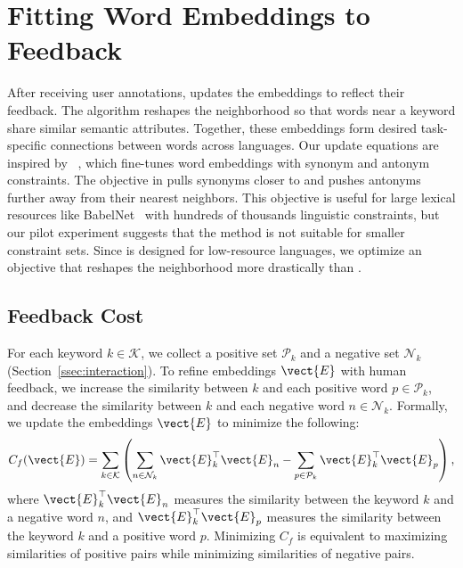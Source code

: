 \section{Fitting Word Embeddings to Feedback}
\label{sec:update}

After receiving user annotations, \name{} updates the
embeddings to reflect their feedback.
The algorithm reshapes the neighborhood so that words near a keyword share similar semantic attributes.
Together, these embeddings form desired task-specific
connections between words across languages.  Our update equations are inspired by ~\citep{mrksic-17}, which fine-tunes word embeddings with
synonym and antonym constraints.
The objective in  pulls synonyms
closer to and pushes antonyms further away from their nearest
neighbors.
This objective is useful for large lexical resources like
BabelNet~\citep{navigli-10} with hundreds of thousands linguistic constraints,
but our pilot experiment suggests that the method is not suitable for smaller
constraint sets.
Since \name{} is designed for low-resource languages, we optimize an
objective that reshapes the neighborhood more drastically than
.

\subsection{Feedback Cost}

For each keyword $k\in\mathcal{K}$, we collect a positive set $\mathcal{P}_k$
and a negative set $\mathcal{N}_k$ (Section~\ref{ssec:interaction}).
To refine embeddings $\vect{E}$ with human feedback, we increase the similarity
between $k$ and each positive word $p\in\mathcal{P}_k$, and decrease the similarity between $k$ and
each negative word $n\in\mathcal{N}_k$.
Formally, we update the embeddings $\vect{E}$ to minimize the following:
\begin{equation}
    C_f(\vect{E}) =
	\sum_{k \in \mathcal{K}} \left(\sum_{n \in \mathcal{N}_k} \vect{E}_k^\top \vect{E}_n - \sum_{p \in \mathcal{P}_k} \vect{E}_k^\top \vect{E}_p\right),
    \label{eq:feedback}
\end{equation}
where $\vect{E}_k^\top \vect{E}_n$ measures the similarity between the keyword $k$ and a negative word $n$, and $\vect{E}_k^\top \vect{E}_p$ measures the similarity between the keyword $k$ and a positive word $p$.  Minimizing $C_f$ is equivalent to maximizing similarities of positive pairs while minimizing similarities of negative pairs.

